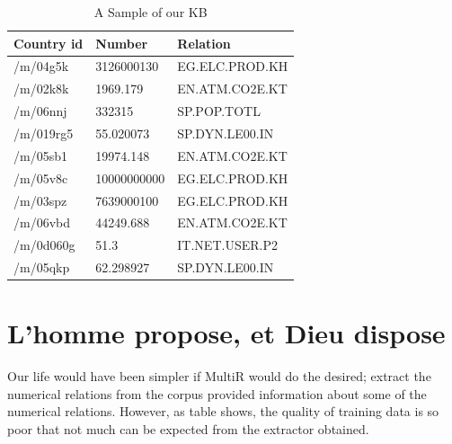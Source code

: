 \documentclass[a4paper,10pt]{article}
\begin{document}
\begin{table}[H]
\centering
\begin{tabular}{|l|l|l|}
\hline
Country id & Number & Relation \\
\hline
/m/04g5k&3126000130&EG.ELC.PROD.KH\\
/m/02k8k&1969.179&EN.ATM.CO2E.KT\\
/m/06nnj&332315&SP.POP.TOTL\\
/m/019rg5&55.020073&SP.DYN.LE00.IN\\
/m/05sb1&19974.148&EN.ATM.CO2E.KT\\
/m/05v8c&10000000000&EG.ELC.PROD.KH\\
/m/03spz&7639000100&EG.ELC.PROD.KH\\
/m/06vbd&44249.688&EN.ATM.CO2E.KT\\
/m/0d060g&51.3&IT.NET.USER.P2\\
/m/05qkp&62.298927&SP.DYN.LE00.IN\\
\hline
\end{tabular}
\caption{A Sample of our KB}
\label{fig:kb}
\end{table}


\section{L'homme propose, et Dieu dispose}
Our life would have been simpler if MultiR would do the desired; extract the numerical relations from the corpus provided
information about some of the numerical relations. However, as table \cite{vanillatable} shows, the quality of training data
is so poor that not much can be expected from the extractor obtained.

\begin{center}
\begin{table}[H]

\caption{Vanilla Match}
\label{vanillatable}
\end{table}
\end{center}
\end{document}
